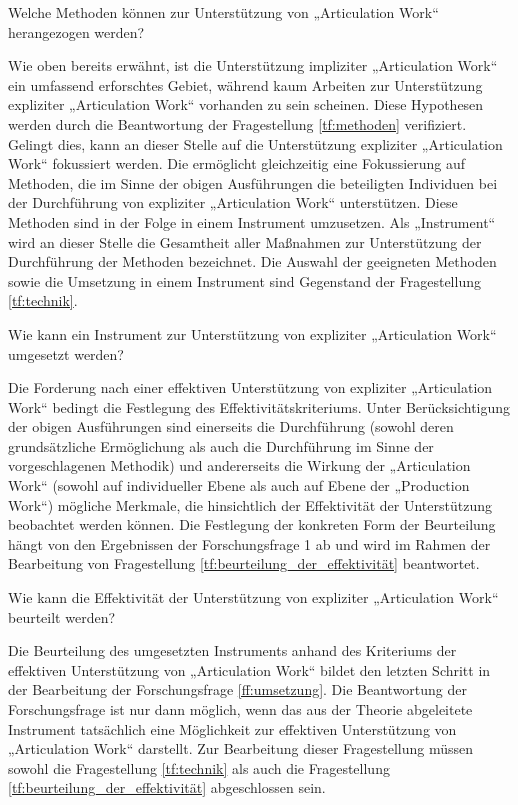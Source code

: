 \begin{tf}
	\label{tf:methoden}
	Welche Methoden können zur Unterstützung von „Articulation Work“ herangezogen werden?
\end{tf}

Wie oben bereits erwähnt, ist die Unterstützung impliziter „Articulation Work“ ein umfassend erforschtes Gebiet, während kaum Arbeiten zur Unterstützung expliziter „Articulation Work“ vorhanden zu sein scheinen. Diese Hypothesen werden durch die Beantwortung der Fragestellung \ref{tf:methoden} verifiziert. Gelingt dies, kann an dieser Stelle auf die Unterstützung expliziter „Articulation Work“ fokussiert werden. Die ermöglicht gleichzeitig eine Fokussierung auf Methoden, die im Sinne der obigen Ausführungen die beteiligten Individuen bei der Durchführung von expliziter „Articulation Work“ unterstützen. Diese Methoden sind in der Folge in einem Instrument umzusetzen. Als „Instrument“ wird an dieser Stelle die Gesamtheit aller Maßnahmen zur Unterstützung der Durchführung der Methoden bezeichnet. Die Auswahl der geeigneten Methoden sowie die Umsetzung in einem Instrument sind Gegenstand der Fragestellung \ref{tf:technik}.

\begin{tf}
	\label{tf:technik}
	Wie kann ein Instrument zur Unterstützung von expliziter „Articulation Work“ umgesetzt werden?
\end{tf}

Die Forderung nach einer effektiven Unterstützung von expliziter „Articulation Work“ bedingt die Festlegung des Effektivitätskriteriums. Unter Berücksichtigung der obigen Ausführungen sind einerseits die Durchführung (sowohl deren grundsätzliche Ermöglichung als auch die Durchführung im Sinne der vorgeschlagenen Methodik) und andererseits die Wirkung der „Articulation Work“ (sowohl auf individueller Ebene als auch auf Ebene der „Production Work“) mögliche Merkmale, die hinsichtlich der Effektivität der Unterstützung beobachtet werden können. Die Festlegung der konkreten Form der Beurteilung hängt von den Ergebnissen der Forschungsfrage 1 ab und wird im Rahmen der Bearbeitung von Fragestellung \ref{tf:beurteilung_der_effektivität} beantwortet.

\begin{tf}
	\label{tf:beurteilung_der_effektivität}
	Wie kann die Effektivität der Unterstützung von expliziter „Articulation Work“ beurteilt werden?
\end{tf}

Die Beurteilung des umgesetzten Instruments anhand des Kriteriums der effektiven Unterstützung von „Articulation Work“ bildet den letzten Schritt in der Bearbeitung der Forschungsfrage \ref{ff:umsetzung}. Die Beantwortung der Forschungsfrage ist nur dann möglich, wenn das aus der Theorie abgeleitete Instrument tatsächlich eine Möglichkeit zur effektiven Unterstützung von „Articulation Work“ darstellt. Zur Bearbeitung dieser Fragestellung müssen sowohl die Fragestellung \ref{tf:technik} als auch die Fragestellung \ref{tf:beurteilung_der_effektivität} abgeschlossen sein.

